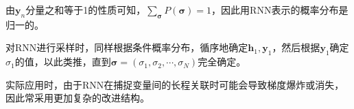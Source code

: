 由$\boldsymbol{y}_n$分量之和等于1的性质可知，$\sum_{\boldsymbol{\sigma}}P(\boldsymbol{\sigma})=1$，因此用RNN表示的概率分布是归一的。

对RNN进行采样时，同样根据条件概率分布，循序地确定$\boldsymbol{h}_1, \boldsymbol{y}_1$，然后根据$\boldsymbol{y}_1$确定$\sigma_1$的值，以此类推，直到$\boldsymbol{\sigma}=(\sigma_{1}, \sigma_{2}, \cdots, \sigma_{N})$完全确定。

实际应用时，由于RNN在捕捉变量间的长程关联时可能会导致梯度爆炸或消失，因此常采用更加复杂的改进结构。